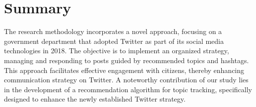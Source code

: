 \section{Summary}

The research methodology incorporates a novel approach, focusing on a government department that adopted Twitter as part of its social media technologies in 2018. The objective is to implement an organized strategy, managing and responding to posts guided by recommended topics and hashtags. This approach facilitates effective engagement with citizens, thereby enhancing communication strategy on Twitter. A noteworthy contribution of our study lies in the development of a recommendation algorithm for topic tracking, specifically designed to enhance the newly established Twitter strategy.\\


